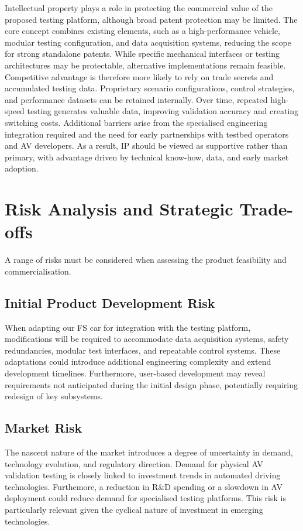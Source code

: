 \documentclass[11pt, a4paper]{report}
\numberwithin{equation}{section}
\begin{document}
\begin{refsection}
Intellectual property plays a role in protecting the commercial value of the proposed testing platform, although broad patent protection may be limited. The core concept combines existing elements, such as a high-performance vehicle, modular testing configuration, and data acquisition systems, reducing the scope for strong standalone patents. While specific mechanical interfaces or testing architectures may be protectable, alternative implementations remain feasible.
Competitive advantage is therefore more likely to rely on trade secrets and accumulated testing data. Proprietary scenario configurations, control strategies, and performance datasets can be retained internally. Over time, repeated high-speed testing generates valuable data, improving validation accuracy and creating switching costs.
Additional barriers arise from the specialised engineering integration required and the need for early partnerships with testbed operators and AV developers. As a result, IP should be viewed as supportive rather than primary, with advantage driven by technical know-how, data, and early market adoption.

\section{Risk Analysis and Strategic Trade-offs}
\label{sec:risk_analysis_strategic_tradeoffs}
\label{sec:ch6-risk-analysis}
A range of risks must be considered when assessing the product feasibility and commercialisation.

\subsection{Initial Product Development Risk}

When adapting our FS car for integration with the testing platform, modifications will be required to accommodate data acquisition systems, safety redundancies, modular test interfaces, and repeatable control systems. These adaptations could introduce additional engineering complexity and extend development timelines. Furthermore, user-based development may reveal requirements not anticipated during the initial design phase, potentially requiring redesign of key subsystems.

\subsection{Market Risk}

The nascent nature of the market introduces a degree of uncertainty in demand, technology evolution, and regulatory direction. Demand for physical AV validation testing is closely linked to investment trends in automated driving technologies. Furthemore, a reduction in R\&D spending or a slowdown in AV deployment could reduce demand for specialised testing platforms. This risk is particularly relevant given the cyclical nature of investment in emerging technologies.


\end{refsection}
\end{document}
